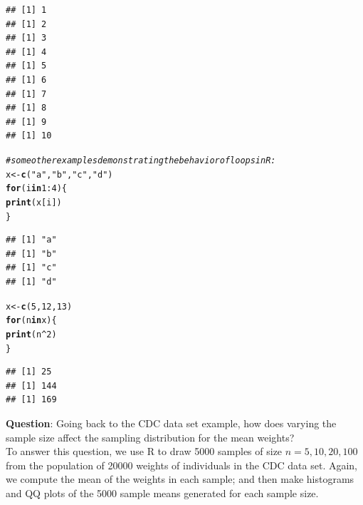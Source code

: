 \documentclass[fleqn]{article}\usepackage[]{graphicx}\usepackage[]{color}
\makeatletter
\newcommand{\hlnum}[1]{\textcolor[rgb]{0.686,0.059,0.569}{#1}}%
\newcommand{\hlstr}[1]{\textcolor[rgb]{0.192,0.494,0.8}{#1}}%
\newcommand{\hlcom}[1]{\textcolor[rgb]{0.678,0.584,0.686}{\textit{#1}}}%
\newcommand{\hlopt}[1]{\textcolor[rgb]{0,0,0}{#1}}%
\newcommand{\hlstd}[1]{\textcolor[rgb]{0.345,0.345,0.345}{#1}}%
\newcommand{\hlkwa}[1]{\textcolor[rgb]{0.161,0.373,0.58}{\textbf{#1}}}%
\newcommand{\hlkwb}[1]{\textcolor[rgb]{0.69,0.353,0.396}{#1}}%
\newcommand{\hlkwd}[1]{\textcolor[rgb]{0.737,0.353,0.396}{\textbf{#1}}}%
\newenvironment{kframe}{%
 \def\at@end@of@kframe{}%
 \ifinner\ifhmode%
  \def\at@end@of@kframe{\end{minipage}}%
  \begin{minipage}{\columnwidth}%
 \fi\fi%
 \def\FrameCommand##1{\hskip\@totalleftmargin \hskip-\fboxsep
 \colorbox{shadecolor}{##1}\hskip-\fboxsep
     \hskip-\linewidth \hskip-\@totalleftmargin \hskip\columnwidth}%
 \MakeFramed {\advance\hsize-\width
   \@totalleftmargin\z@ \linewidth\hsize
   \@setminipage}}%
 {\par\unskip\endMakeFramed%
 \at@end@of@kframe}
\newenvironment{knitrout}{}{} %
\makeatother
\begin{document}
\begin{knitrout}
\begin{kframe}
\begin{alltt}
\end{alltt}
\begin{verbatim}
## [1] 1
## [1] 2
## [1] 3
## [1] 4
## [1] 5
## [1] 6
## [1] 7
## [1] 8
## [1] 9
## [1] 10
\end{verbatim}
\begin{alltt}
\hlcom{# some other examples demonstrating the behavior of loops in R:}
\hlstd{x} \hlkwb{<-} \hlkwd{c}\hlstd{(}\hlstr{"a"}\hlstd{,} \hlstr{"b"}\hlstd{,} \hlstr{"c"}\hlstd{,} \hlstr{"d"}\hlstd{)}
\hlkwa{for}\hlstd{(i} \hlkwa{in} \hlnum{1}\hlopt{:}\hlnum{4}\hlstd{) \{}
  \hlkwd{print}\hlstd{(x[i])}
\hlstd{\}}
\end{alltt}
\begin{verbatim}
## [1] "a"
## [1] "b"
## [1] "c"
## [1] "d"
\end{verbatim}
\begin{alltt}
\hlstd{x} \hlkwb{<-} \hlkwd{c}\hlstd{(}\hlnum{5}\hlstd{,} \hlnum{12}\hlstd{,} \hlnum{13}\hlstd{)}
\hlkwa{for}\hlstd{(n} \hlkwa{in} \hlstd{x) \{}
  \hlkwd{print}\hlstd{(n}\hlopt{^}\hlnum{2}\hlstd{)}
\hlstd{\}}
\end{alltt}
\begin{verbatim}
## [1] 25
## [1] 144
## [1] 169
\end{verbatim}
\end{kframe}
\end{knitrout}


\clearpage

\textbf{Question}: Going back to the CDC data set example, how does varying the sample size affect the sampling distribution for the mean weights?\\  

To answer this question, we use R to draw 5000 samples of size $n=5, 10, 20, 100$ from the population of 20000 weights of individuals in the CDC data set.  Again, we compute the mean of the weights in each sample; and then make histograms and QQ plots of the 5000 sample means generated for each sample size.
\end{document}
